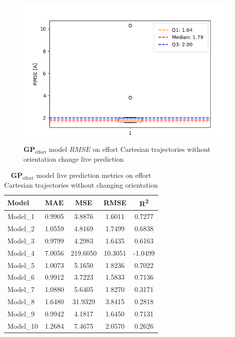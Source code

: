     \begin{figure}[H]
    \centering
    \includegraphics[width=1\columnwidth]{Images/05_results/effort_boxplot_live_non_OC_RMSE.png}
    \caption[\(\boldsymbol{GP}_{\text{effort}}\) model \(RMSE\) on effort Cartesian trajectories without orientation change live prediction]{\(\boldsymbol{GP}_{\text{effort}}\) model \(RMSE\) on effort Cartesian trajectories without orientation change live prediction}
    \label{fig:effort_no_oc_RMSE_live}
    \end{figure}
    
    \begin{table}[H]
    \centering
    \begin{tabular}{lcccc}
    \toprule
    \textbf{Model} & \textbf{MAE} & \textbf{MSE} & \textbf{RMSE} & \textbf{R\textsuperscript{2}} \\
    \midrule
    Model\_1 & 0.9905 & 3.8876 & 1.6011 & 0.7277 \\
    Model\_2 & 1.0559 & 4.8169 & 1.7499 & 0.6838 \\
    Model\_3 & 0.9799 & 4.2983 & 1.6435 & 0.6163 \\
    Model\_4 & 7.0056 & 219.6050 & 10.3051 & -1.0499 \\
    Model\_5 & 1.0073 & 5.1650 & 1.8236 & 0.7022 \\
    Model\_6 & 0.9912 & 3.7223 & 1.5833 & 0.7136 \\
    Model\_7 & 1.0880 & 5.6405 & 1.8270 & 0.3171 \\
    Model\_8 & 1.6480 & 31.9329 & 3.8415 & 0.2818 \\
    Model\_9 & 0.9942 & 4.1817 & 1.6450 & 0.7131 \\
    Model\_10 & 1.2684 & 7.4675 & 2.0570 & 0.2626 \\
    \bottomrule
    \end{tabular}
    \caption{\(\boldsymbol{GP}_{\text{effort}}\) model live prediction metrics on effort Cartesian trajectories without changing orientation}
    \end{table}

